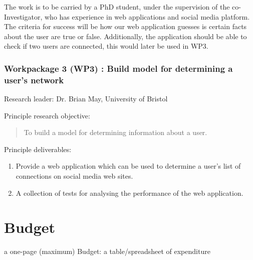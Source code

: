 \documentclass[a4paper,11pt]{article}
\begin{document}
The work is to be carried by a PhD student, under the supervision of the co-Investigator, who has experience in web applications and social media platform. The criteria for success will be how  our web application guesses is certain facts about the user are true or false. Additionally, the application should be able to check if two users are connected, this would later be used in WP3.

\subsubsection*{Workpackage 3 (WP3) : Build model for determining a user's network}
Research leader: Dr. Brian May, University of Bristol

Principle research objective:
\begin{quote}
	To build a model for determining information about a user.
\end{quote}

Principle deliverables:
\begin{enumerate}
\item Provide a web application which can be used to determine a user's list of connections on social media web sites.
\item A collection of tests for analysing the performance of the web application.
\end{enumerate}














\newpage
\section*{Budget}

a one-page (maximum) Budget: a table/spreadsheet of expenditure
\end{document}
